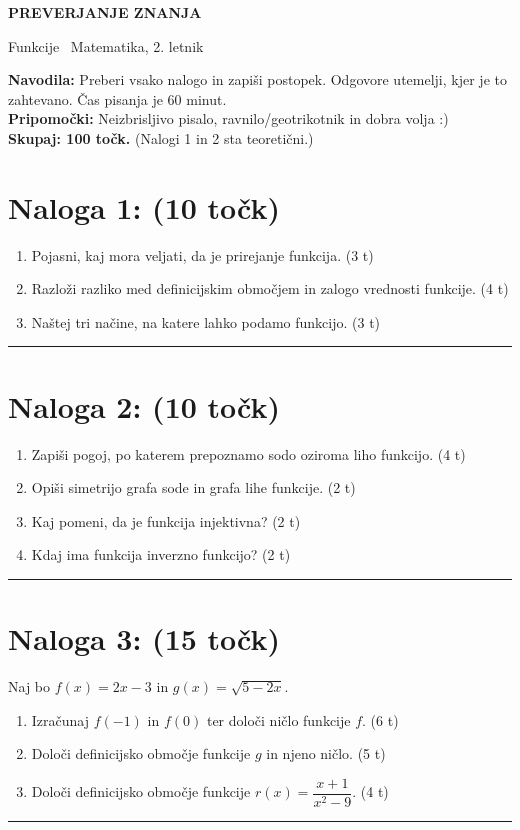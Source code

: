 \documentclass[a4paper,12pt]{article}
\newcommand{\naloga}[3]{%
	\section*{Naloga #1: #2 \hfill\normalfont\normalsize(#3 točk)}%
}
\newcommand{\odgovor}[1]{\par\noindent\rule{\linewidth}{0.35pt}\par\vspace{#1}}
\begin{document}
\begin{center}
	{\LARGE\bfseries\color{bordotemno} PREVERJANJE ZNANJA}\par
	\vspace{2mm}
	{\large Funkcije \textbar\ Matematika, 2. letnik}
\end{center}

\vspace{3mm}
\noindent
{}

\vspace{4mm}
\noindent\textbf{Navodila:} Preberi vsako nalogo in zapiši postopek. Odgovore utemelji, kjer je to zahtevano. Čas pisanja je 60 minut. \\ 
\textbf{Pripomočki:} Neizbrisljivo pisalo, 
ravnilo/geotrikotnik in dobra volja :) \\
\textbf{Skupaj: 100 točk.} (Nalogi 1 in 2 sta teoretični.)

\naloga{1}{}{10}
\begin{enumerate}
	\item Pojasni, kaj mora veljati, da je prirejanje funkcija. \hfill(3 t)
	\item Razloži razliko med definicijskim območjem in zalogo vrednosti funkcije. \hfill(4 t)
	\item Naštej tri načine, na katere lahko podamo funkcijo. \hfill(3 t)
\end{enumerate}
\odgovor{6cm}

\newpage
\naloga{2}{}{10}
\begin{enumerate}
	\item Zapiši pogoj, po katerem prepoznamo sodo oziroma liho funkcijo. \hfill(4 t)
	\item Opiši simetrijo grafa sode in grafa lihe funkcije. \hfill(2 t)
	\item Kaj pomeni, da je funkcija injektivna?  \hfill(2 t)
	\item Kdaj ima funkcija inverzno funkcijo? \hfill(2 t)
\end{enumerate}
\odgovor{7cm}

\newpage
\naloga{3}{}{15}
Naj bo $f(x)=2x-3$ in $g(x)=\sqrt{5-2x}$.
\begin{enumerate}
	\item Izračunaj $f(-1)$ in $f(0)$ ter določi ničlo funkcije $f$. \hfill(6 t)
	\item Določi definicijsko območje funkcije $g$ in njeno ničlo. \hfill(5 t)
	\item Določi definicijsko območje funkcije $r(x)=\dfrac{x+1}{x^2-9}$. \hfill(4 t)
\end{enumerate}
\odgovor{7cm}
\end{document}
